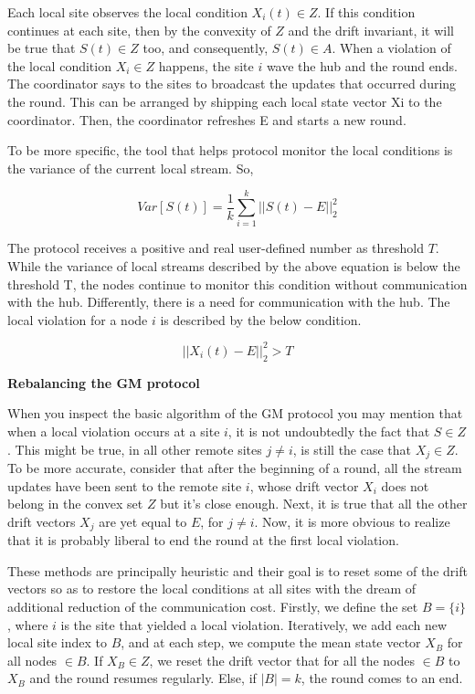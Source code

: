 Each local site observes the local condition $X_i(t) \in Z$.
If this condition continues at each site, then by the convexity of $Z$ and the drift invariant, it will be true that $S(t) \in Z$ too, and consequently, $S(t) \in A$.
When a violation of the local condition $X_i \in Z$ happens, the site $i$ wave the hub and the round ends.
The coordinator says to the sites to broadcast the updates that occurred during the round.
This can be arranged by shipping each local state vector Xi to the coordinator.
Then, the coordinator refreshes E and starts a new round.

To be more specific, the tool that helps protocol monitor the local conditions is the variance of the current local stream.
So,

\begin{equation}
    Var[S(t)] = \frac{1}{k} \sum_{i=1}^{k} ||S(t) - E ||^2_2\label{eq:equation32}
\end{equation}

The protocol receives a positive and real user-defined number as threshold $T$.
While the variance of local streams described by the above equation is below the threshold T,
the nodes continue to monitor this condition without communication with the hub.
Differently, there is a need for communication with the hub.
The local violation for a node $i$ is described by the below condition.

\begin{equation}
    ||X_i(t) - E ||^2_2 > T\label{eq:equation33}
\end{equation}

{\large \textbf{Rebalancing the GM protocol}}

When you inspect the basic algorithm of the GM protocol you may mention that when a local violation occurs at a site $i$,
it is not undoubtedly the fact that $S \in Z$.
This might be true, in all other remote sites $j \neq i$, is still the case that $X_j \in Z$.
To be more accurate, consider that after the beginning of a round, all the stream updates have been sent to the remote site $i$,
whose drift vector $X_i$ does not belong in the convex set $Z$ but it’s close enough.
Next, it is true that all the other drift vectors $X_j$ are yet equal to $E$, for $j \neq i$.
Now, it is more obvious to realize that it is probably liberal to end the round at the first local violation.

These methods are principally heuristic and their goal is to reset some of the drift vectors so as to restore the local conditions at all sites with the dream of additional reduction of the communication cost.
Firstly, we define the set $B = \{i\}$, where $i$ is the site that yielded a local violation.
Iteratively, we add each new local site index to $B$, and at each step, we compute the mean state vector $X_B$  for all nodes $\in B$.
If $X_B \in Z$, we reset the drift vector that for all the nodes $\in B$ to $X_B$ and the round resumes regularly.
Else, if $|B| = k$, the round comes to an end.


